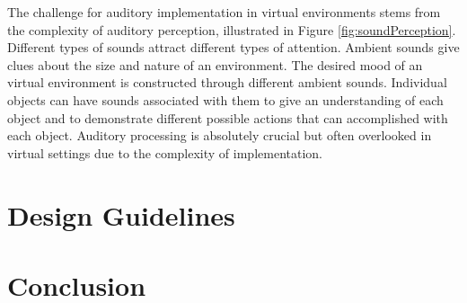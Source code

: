 \par The challenge for auditory implementation in virtual environments stems from the complexity of auditory perception, illustrated in Figure \ref{fig:soundPerception}. Different types of sounds attract different types of attention. Ambient sounds give clues about the size and nature of an environment. The desired mood of an virtual environment is constructed through different ambient sounds. Individual objects can have sounds associated with them to give an understanding of each object and to demonstrate different possible actions that can accomplished with each object. Auditory processing is absolutely crucial but often overlooked in virtual settings due to the complexity of implementation. 



\section{Design Guidelines} \label{Guidelines}




\section{Conclusion} \label{Guidelines}











